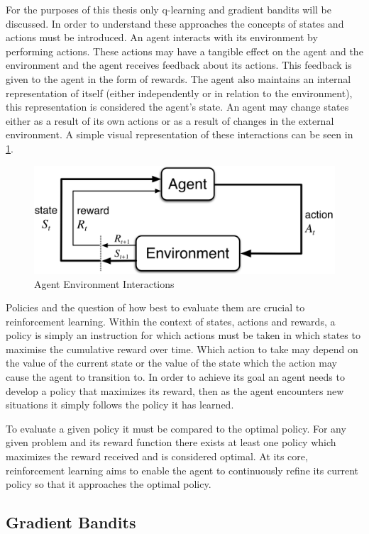 For the purposes of this thesis only q-learning and gradient bandits will be discussed. In order to understand these approaches the concepts of states and actions must be introduced. An agent interacts with its environment by performing actions. These actions may have a tangible effect on the agent and the environment and the agent receives feedback about its actions. This feedback is given to the agent in the form of rewards. The agent also maintains an internal representation of itself (either independently or in relation to the environment), this representation is considered the agent’s state. An agent may change states either as a result of its own actions or as a result of changes in the external environment. A simple visual representation of these interactions can be seen in \ref{fig:agent}.

\begin{figure}[htp]
    \centering
        \includegraphics[width=.65\textwidth]{fig/agent.png}
        \caption{Agent Environment Interactions \cite{sutton_barto}}
        \label{fig:agent}
\end{figure}

Policies and the question of how best to evaluate them are crucial to reinforcement learning. Within the context of states, actions and rewards, a policy is simply an instruction for which actions must be taken in which states to maximise the cumulative reward over time. Which action to take may depend on the value of the current state or the value of the state which the action may cause the agent to transition to. In order to achieve its goal an agent needs to develop a policy that maximizes its reward, then as the agent encounters new situations it simply follows the policy it has learned. 

To evaluate a given policy it must be compared to the optimal policy. For any given problem and its reward function there exists at least one policy which maximizes the reward received and is considered optimal. At its core, reinforcement learning aims to enable the agent to continuously refine its current policy so that it approaches the optimal policy. 

\subsection{Gradient Bandits}
\label{subsection_gradient_bandits}

